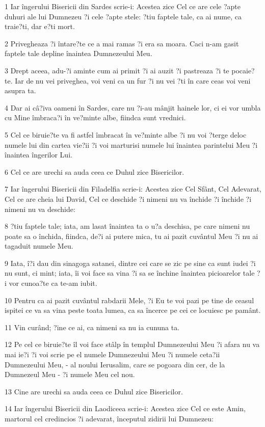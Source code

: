 \par 1 Iar îngerului Bisericii din Sardes scrie-i: Acestea zice Cel ce are cele ?apte duhuri ale lui Dumnezeu ?i cele ?apte stele: ?tiu faptele tale, ca ai nume, ca traie?ti, dar e?ti mort.
\par 2 Privegheaza ?i întare?te ce a mai ramas ?i era sa moara. Caci n-am gasit faptele tale depline înaintea Dumnezeului Meu.
\par 3 Drept aceea, adu-?i aminte cum ai primit ?i ai auzit ?i pastreaza ?i te pocaie?te. Iar de nu vei priveghea, voi veni ca un fur ?i nu vei ?ti în care ceas voi veni asupra ta.
\par 4 Dar ai câ?iva oameni în Sardes, care nu ?i-au mânjit hainele lor, ci ei vor umbla cu Mine îmbraca?i în ve?minte albe, fiindca sunt vrednici.
\par 5 Cel ce biruie?te va fi astfel îmbracat în ve?minte albe ?i nu voi ?terge deloc numele lui din cartea vie?ii ?i voi marturisi numele lui înaintea parintelui Meu ?i înaintea îngerilor Lui.
\par 6 Cel ce are urechi sa auda ceea ce Duhul zice Bisericilor.
\par 7 Iar îngerului Bisericii din Filadelfia scrie-i: Acestea zice Cel Sfânt, Cel Adevarat, Cel ce are cheia lui David, Cel ce deschide ?i nimeni nu va închide ?i închide ?i nimeni nu va deschide:
\par 8 ?tiu faptele tale; iata, am lasat înaintea ta o u?a deschisa, pe care nimeni nu poate sa o închida, fiindca, de?i ai putere mica, tu ai pazit cuvântul Meu ?i nu ai tagaduit numele Meu.
\par 9 Iata, î?i dau din sinagoga satanei, dintre cei care se zic pe sine ca sunt iudei ?i nu sunt, ci mint; iata, îi voi face sa vina ?i sa se închine înaintea picioarelor tale ?i vor cunoa?te ca te-am iubit.
\par 10 Pentru ca ai pazit cuvântul rabdarii Mele, ?i Eu te voi pazi pe tine de ceasul ispitei ce va sa vina peste toata lumea, ca sa încerce pe cei ce locuiesc pe pamânt.
\par 11 Vin curând; ?ine ce ai, ca nimeni sa nu ia cununa ta.
\par 12 Pe cel ce biruie?te îl voi face stâlp în templul Dumnezeului Meu ?i afara nu va mai ie?i ?i voi scrie pe el numele Dumnezeului Meu ?i numele ceta?ii Dumnezeului Meu, - al noului Ierusalim, care se pogoara din cer, de la Dumnezeul Meu - ?i numele Meu cel nou.
\par 13 Cine are urechi sa auda ceea ce Duhul zice Bisericilor.
\par 14 Iar îngerului Bisericii din Laodiceea scrie-i: Acestea zice Cel ce este Amin, martorul cel credincios ?i adevarat, începutul zidirii lui Dumnezeu:
